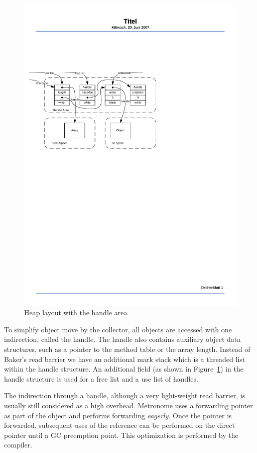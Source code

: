 \begin{figure}[t]
  \centering
  \includegraphics{jvm/handles}
  \caption{Heap layout with the handle area}\label{fig:handles}
\end{figure}

To simplify object move by the collector, all objects are accessed
with one indirection, called the handle. The handle also contains
auxiliary object data structures, such as a pointer to the method
table or the array length. Instead of Baker's read barrier we have an
additional mark stack which is a threaded list within the handle
structure. An additional field (as shown in Figure~\ref{fig:handles})
in the handle structure is used for a free list and a use list of
handles.

The indirection through a handle, although a very light-weight read
barrier, is usually still considered as a high overhead. Metronome
\cite{gc:bacon03} uses a forwarding pointer as part of the object and
performs forwarding \emph{eagerly}. Once the pointer is forwarded,
subsequent uses of the reference can be performed on the direct
pointer until a GC preemption point. This optimization is performed
by the compiler.

